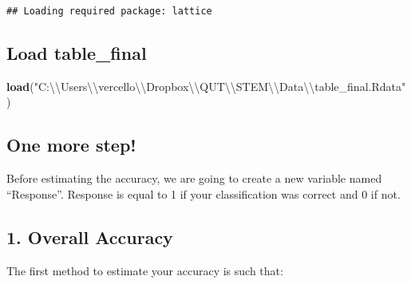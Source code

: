 \documentclass[]{article}
\newenvironment{Shaded}{\begin{snugshade}}{\end{snugshade}}
\newcommand{\KeywordTok}[1]{\textcolor[rgb]{0.13,0.29,0.53}{\textbf{#1}}}
\newcommand{\DataTypeTok}[1]{\textcolor[rgb]{0.13,0.29,0.53}{#1}}
\newcommand{\DecValTok}[1]{\textcolor[rgb]{0.00,0.00,0.81}{#1}}
\newcommand{\CharTok}[1]{\textcolor[rgb]{0.31,0.60,0.02}{#1}}
\newcommand{\StringTok}[1]{\textcolor[rgb]{0.31,0.60,0.02}{#1}}
\newcommand{\OperatorTok}[1]{\textcolor[rgb]{0.81,0.36,0.00}{\textbf{#1}}}
\newcommand{\NormalTok}[1]{#1}
\begin{document}
\begin{verbatim}
## Loading required package: lattice
\end{verbatim}

\subsection{Load table\_final}\label{load-table_final}

\begin{Shaded}
\begin{Highlighting}[]
\KeywordTok{load}\NormalTok{(}\StringTok{"C:}\CharTok{\textbackslash{}\textbackslash{}}\StringTok{Users}\CharTok{\textbackslash{}\textbackslash{}}\StringTok{vercello}\CharTok{\textbackslash{}\textbackslash{}}\StringTok{Dropbox}\CharTok{\textbackslash{}\textbackslash{}}\StringTok{QUT}\CharTok{\textbackslash{}\textbackslash{}}\StringTok{STEM}\CharTok{\textbackslash{}\textbackslash{}}\StringTok{Data}\CharTok{\textbackslash{}\textbackslash{}}\StringTok{table_final.Rdata"}\NormalTok{)}
\end{Highlighting}
\end{Shaded}

\subsection{One more step!}\label{one-more-step}

Before estimating the accuracy, we are going to create a new variable
named ``Response''. Response is equal to 1 if your classification was
correct and 0 if not.

\begin{Shaded}
\end{Shaded}

\subsection{1. Overall Accuracy}\label{overall-accuracy}

The first method to estimate your accuracy is such that:
\end{document}
